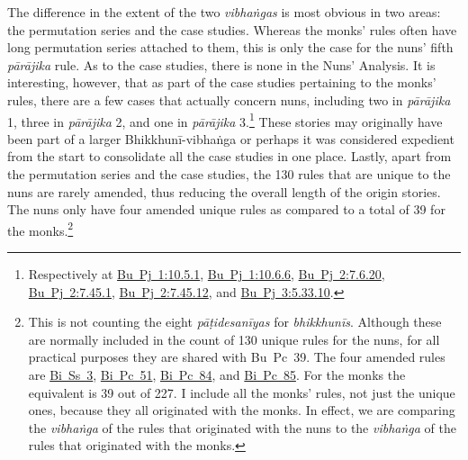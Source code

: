 \documentclass[12pt,openany]{book}%
\begin{document}
The difference in the extent of the two \textit{\textsanskrit{vibhaṅgas}} is most obvious in two areas: the permutation series and the case studies. Whereas the monks’ rules often have long permutation series attached to them, this is only the case for the nuns’ fifth \textit{\textsanskrit{pārājika}} rule. As to the case studies, there is none in the Nuns’ Analysis. It is interesting, however, that as part of the case studies pertaining to the monks’ rules, there are a few cases that actually concern nuns, including two in \textit{\textsanskrit{pārājika}} 1, three in \textit{\textsanskrit{pārājika}} 2, and one in \textit{\textsanskrit{pārājika}} 3.\footnote{Respectively at \href{https://suttacentral.net/pli-tv-bu-vb-pj1/en/brahmali\#10.5.1}{Bu~Pj~1:10.5.1}, \href{https://suttacentral.net/pli-tv-bu-vb-pj1/en/brahmali\#10.6.6}{Bu~Pj~1:10.6.6}, \href{https://suttacentral.net/pli-tv-bu-vb-pj2/en/brahmali\#7.6.20}{Bu~Pj~2:7.6.20}, \href{https://suttacentral.net/pli-tv-bu-vb-pj2/en/brahmali\#7.45.1}{Bu~Pj~2:7.45.1}, \href{https://suttacentral.net/pli-tv-bu-vb-pj2/en/brahmali\#7.45.12}{Bu~Pj~2:7.45.12}, and \href{https://suttacentral.net/pli-tv-bu-vb-pj3/en/brahmali\#5.33.10}{Bu~Pj~3:5.33.10}. } These stories may originally have been part of a larger \textsanskrit{Bhikkhunī}-\textsanskrit{vibhaṅga} or perhaps it was considered expedient from the start to consolidate all the case studies in one place. Lastly, apart from the permutation series and the case studies, the 130 rules that are unique to the nuns are rarely amended, thus reducing the overall length of the origin stories. The nuns only have four amended unique rules as compared to a total of 39 for the monks.\footnote{This is not counting the eight \textit{\textsanskrit{pāṭidesanīyas}} for \textit{\textsanskrit{bhikkhunīs}}. Although these are normally included in the count of 130 unique rules for the nuns, for all practical purposes they are shared with Bu Pc 39. The four amended rules are \href{https://suttacentral.net/pli-tv-bi-vb-ss3/en/brahmali\#1.16.1}{Bi~Ss~3}, \href{https://suttacentral.net/pli-tv-bi-vb-pc51/en/brahmali\#1.12.1}{Bi~Pc~51}, \href{https://suttacentral.net/pli-tv-bi-vb-pc84/en/brahmali\#1.1.14.1}{Bi~Pc~84}, and \href{https://suttacentral.net/pli-tv-bi-vb-pc85/en/brahmali\#1.1.14.1}{Bi~Pc~85}. For the monks the equivalent is 39 out of 227. I include all the monks’ rules, not just the unique ones, because they all originated with the monks. In effect, we are comparing the \textit{\textsanskrit{vibhaṅga}} of the rules that originated with the nuns to the \textit{\textsanskrit{vibhaṅga}} of the rules that originated with the monks. }
\end{document}
